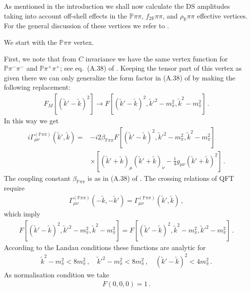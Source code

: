 \documentclass[a4paper,11pt]{article}
\newcommand{\nn}{\nonumber}
\newcommand{\Pom}{\mathbb{P}}
\newcommand{\Reg}{\mathbb{R}}
\begin{document}
As mentioned in the introduction we shall now calculate
the DS amplitudes taking into account off-shell effects
in the $\Pom \pi \pi$, $f_{2 \Reg} \pi \pi$,
and $\rho_{\Reg} \pi \pi$ effective vertices.
For the general discussion of these vertices
we refer to \cite{Lebiedowicz:2025xob,Bolz:2014mya,Ewerz:2013kda}.

We start with the $\Pom \pi \pi$ vertex.

First, we note that from $C$ invariance 
we have the same vertex function for $\Pom \pi^{-} \pi^{-}$
and $\Pom \pi^{+} \pi^{+}$; see eq.~(A.38) of \cite{Lebiedowicz:2025xob}.
Keeping the tensor part of this vertex as given there 
we can only generalize the form factor in (A.38) of \cite{Lebiedowicz:2025xob} by making the following replacement:
%
\begin{eqnarray}
F_{M}[(\tilde{k}'-\tilde{k})^{2}] \to 
F[(\tilde{k}'-\tilde{k})^{2},\tilde{k}'^{2}-m_{\pi}^{2},\tilde{k}^{2}-m_{\pi}^{2}]\,.
\label{2.100}
\end{eqnarray}
%
In this way we get
%
\begin{align}
i\Gamma_{\mu \nu}^{(\Pom \pi \pi)}(\tilde{k}',\tilde{k})
=& -i 2 \beta_{\Pom \pi \pi} 
F[(\tilde{k}'-\tilde{k})^{2},\tilde{k}'^{2}-m_{\pi}^{2},\tilde{k}^{2}-m_{\pi}^{2}]\nn\\
& \times
\left[ (\tilde{k}' + \tilde{k})_{\mu} 
       (\tilde{k}' + \tilde{k})_{\nu}
- \frac{1}{4} g_{\mu \nu} (\tilde{k}' + \tilde{k})^{2} \right]\,.
\label{A1}
\end{align}
%
The coupling constant $\beta_{\Pom \pi \pi}$ 
is as in (A.38) of \cite{Lebiedowicz:2025xob}.
The crossing relations of QFT require
%
\begin{align}
\Gamma_{\mu \nu}^{(\Pom \pi \pi)}(-\tilde{k},-\tilde{k}')
= \Gamma_{\mu \nu}^{(\Pom \pi \pi)}(\tilde{k}',\tilde{k})\,,
\label{A2}
\end{align}
%
which imply
%
\begin{align}
F[(\tilde{k}'-\tilde{k})^{2},\tilde{k}'^{2}-m_{\pi}^{2},\tilde{k}^{2}-m_{\pi}^{2}]
=
F[(\tilde{k}'-\tilde{k})^{2},\tilde{k}^{2}-m_{\pi}^{2},\tilde{k}'^{2}-m_{\pi}^{2}]\,.
\label{A3}
\end{align}
%
According to the Landau conditions these functions are analytic for
%
\begin{align}
\tilde{k}^{2} - m_{\pi}^{2} < 8 m_{\pi}^{2}\,, \quad
\tilde{k}'^{2} - m_{\pi}^{2} < 8 m_{\pi}^{2}\,, \quad
(\tilde{k}'-\tilde{k})^{2} < 4 m_{\pi}^{2}\,.
\label{A4}
\end{align}
%
As normalisation condition we take
%
\begin{align}
F(0,0,0)=1\,.
\label{A5}
\end{align}
%
\end{document}
